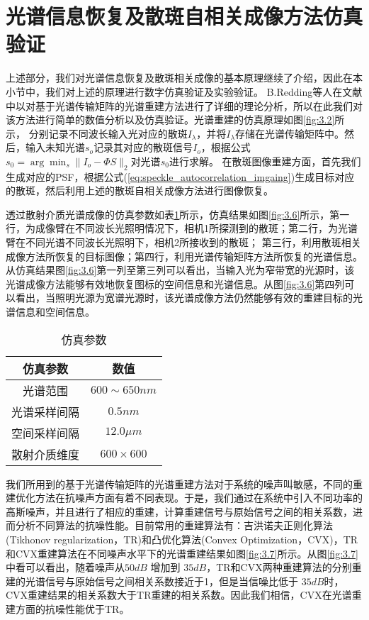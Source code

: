 \section{光谱信息恢复及散斑自相关成像方法仿真验证}\label{光谱传输矩阵章节}
上述部分，我们对光谱信息恢复及散斑相关成像的基本原理继续了介绍，因此在本小节中，我们对上述的原理进行数字仿真验证及实验验证。
B.Redding等人在文献中以对基于光谱传输矩阵的光谱重建方法进行了详细的理论分析，所以在此我们对该方法进行简单的数值分析以及仿真验证。光谱重建的仿真原理如图\ref{fig:3.2}所示，
分别记录不同波长输入光对应的散斑$I_\lambda$，并将$I_\lambda$存储在光谱传输矩阵中。然后，输入未知光谱$s_{o}$记录其对应的散斑信号$I_{o}$，根据公式$s_{0}=\arg{\min_s \| I_{o} -{\Phi}S \|_2}$对光谱$s_{0}$进行求解。
在散斑图像重建方面，首先我们生成对应的PSF，根据公式(\ref{eq:speckle_autocorrelation_imgaing})生成目标对应的散斑，然后利用上述的散斑自相关成像方法进行图像恢复。

透过散射介质光谱成像的仿真参数如表\ref{table:1.1}所示，仿真结果如图\ref{fig:3.6}所示，第一行，为成像臂在不同波长光照明情况下，相机1所探测到的散斑；第二行，为光谱臂在不同光谱不同波长光照明下，相机2所接收到的散斑；
第三行，利用散斑相关成像方法所恢复的目标图像；第四行，利用光谱传输矩阵方法所恢复的光谱信息。从仿真结果图\ref{fig:3.6}第一列至第三列可以看出，当输入光为窄带宽的光源时，该光谱成像方法能够有效地恢复图标的空间信息和光谱信息。从图\ref{fig:3.6}第四列可以看出，当照明光源为宽谱光源时，该光谱成像方法仍然能够有效的重建目标的光谱信息和空间信息。

\begin{table}[htp]
\begin{center}
\caption{仿真参数}
\label{table:1.1}
\begin{tabular}{|c|c|}
\hline
\textbf{仿真参数} & \textbf{数值}\\
\hline
光谱范围 & $600 \sim 650 nm$ \\
\hline
光谱采样间隔 & $0.5  nm$\\
\hline
空间采样间隔 & $12.0 \mu m$ \\
\hline
散射介质维度 & $600 \times 600$ \\
\hline
\end{tabular}
\end{center}
\end{table}

我们所用到的基于光谱传输矩阵的光谱重建方法对于系统的噪声叫敏感，不同的重建优化方法在抗噪声方面有着不同表现。于是，我们通过在系统中引入不同功率的高斯噪声，并且进行了相应的重建，计算重建信号与原始信号之间的相关系数，进而分析不同算法的抗噪性能。目前常用的重建算法有：吉洪诺夫正则化算法(Tikhonov regularization，TR)和凸优化算法(Convex Optimization，CVX)，TR和CVX重建算法在不同噪声水平下的光谱重建结果如图\ref{fig:3.7}所示。从图\ref{fig:3.7}中看可以看出，随着噪声从$50 dB$ 增加到 $35 dB$，TR和CVX两种重建算法的分别重建的光谱信号与原始信号之间相关系数接近于1，但是当信噪比低于 $35 dB$时，CVX重建结果的相关系数大于TR重建的相关系数。因此我们相信，CVX在光谱重建方面的抗噪性能优于TR。

